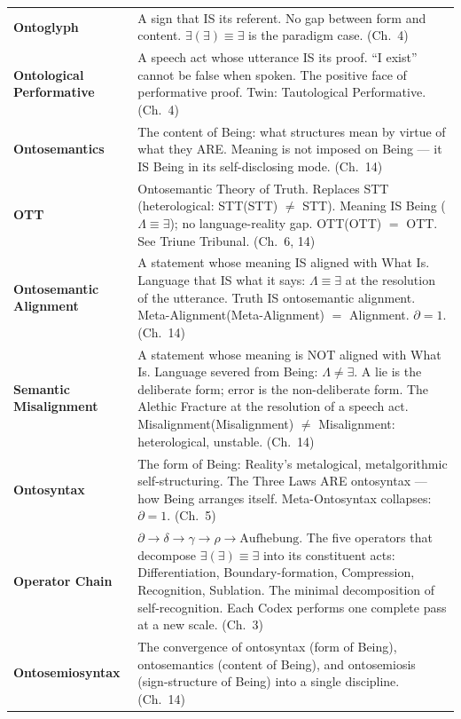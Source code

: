 \documentclass[10pt, openany, oneside]{book}
\renewcommand{\footnotesize}{\fontsize{8.5}{11}\selectfont}
\begin{document}
{\footnotesize
\noindent\begin{tabular}{@{} l @{\hspace{0.6em}} p{} @{}}
\textbf{Ontoglyph} & A sign that IS its referent. No gap between form and content. $\exists(\exists) \equiv \exists$ is the paradigm case. (Ch.\ 4) \\[0.3em]
\textbf{Ontological Performative} & A speech act whose utterance IS its proof. ``I exist'' cannot be false when spoken. The positive face of performative proof. Twin: Tautological Performative. (Ch.\ 4) \\[0.3em]
\textbf{Ontosemantics} & The content of Being: what structures mean by virtue of what they ARE. Meaning is not imposed on Being --- it IS Being in its self-disclosing mode. (Ch.\ 14) \\[0.3em]
\textbf{OTT} & Ontosemantic Theory of Truth. Replaces STT (heterological: STT(STT) $\neq$ STT). Meaning IS Being ($\Lambda \equiv \exists$); no language-reality gap. OTT(OTT) $=$ OTT. See Triune Tribunal. (Ch.\ 6, 14) \\[0.3em]
\textbf{Ontosemantic Alignment} & A statement whose meaning IS aligned with What Is. Language that IS what it says: $\Lambda \equiv \exists$ at the resolution of the utterance. Truth IS ontosemantic alignment. Meta-Alignment(Meta-Alignment) $=$ Alignment. $\partial = 1$. (Ch.\ 14) \\[0.3em]
\textbf{Semantic Misalignment} & A statement whose meaning is NOT aligned with What Is. Language severed from Being: $\Lambda \neq \exists$. A lie is the deliberate form; error is the non-deliberate form. The Alethic Fracture at the resolution of a speech act. Misalignment(Misalignment) $\neq$ Misalignment: heterological, unstable. (Ch.\ 14) \\[0.3em]
\textbf{Ontosyntax} & The form of Being: Reality's metalogical, metalgorithmic self-structuring. The Three Laws ARE ontosyntax --- how Being arranges itself. Meta-Ontosyntax collapses: $\partial = 1$. (Ch.\ 5) \\[0.3em]
\textbf{Operator Chain} & $\partial \to \delta \to \gamma \to \rho \to \text{Aufhebung}$. The five operators that decompose $\exists(\exists) \equiv \exists$ into its constituent acts: Differentiation, Boundary-formation, Compression, Recognition, Sublation. The minimal decomposition of self-recognition. Each Codex performs one complete pass at a new scale. (Ch.\ 3) \\[0.3em]
\textbf{Ontosemiosyntax} & The convergence of ontosyntax (form of Being), ontosemantics (content of Being), and ontosemiosis (sign-structure of Being) into a single discipline. (Ch.\ 14) \\[0.3em]
\end{tabular}
}
\end{document}

